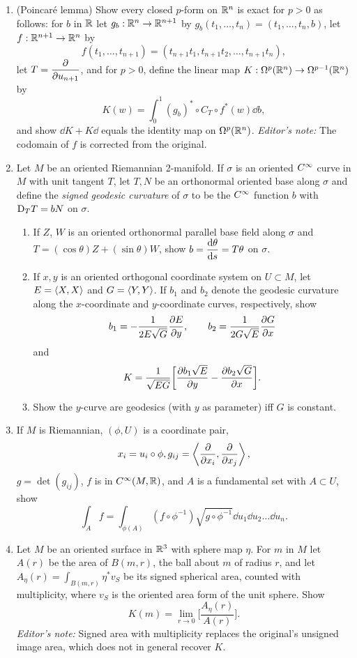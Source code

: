 \documentclass[../main]{subfiles}
\begin{document}
\begin{enumerate}
    
    \item\label{pro:71} (Poincar\'e lemma) Show every closed $p$-form on $\bbR^{n}$ is exact for $p>0$ as follows: for $b$ in $\bbR$ let $g_{b}: \bbR^{n} \rightarrow \bbR^{n+1}$ by $g_{b}\left(t_{1}, \ldots, t_{n}\right)=\left(t_{1}, \ldots, t_{n}, b\right)$, let $f: \bbR^{n+1} \rightarrow \bbR^n$ by \[f\left(t_{1}, \ldots, t_{n+1}\right)=\left(t_{n+1} t_{1}, t_{n+1} t_{2}, \ldots, t_{n+1} t_{n}\right),\] let $T=\pdv{}{u_{n+1}}$, and for $p>0$, define the linear map $K: \formbundle{\bbR^{n}}{p} \rightarrow \formbundle{\bbR^{n}}{p-1}$ by \[K(w)=\int_{0}^{1}(g_{b})^\ast \circ C_{T} \circ f^\ast(w) \dd b,\] and show $\dd K+K \dd$ equals the identity map on $\formbundle{\bbR^{n}}{p}$. \emph{Editor's note:} The codomain of $f$ is corrected from the original.
    \item\label{pro:72} Let $M$ be an oriented Riemannian 2-manifold. If $\sigma$ is an oriented $\CInfty$ curve in $M$ with unit tangent $T$, let $T, N$ be an orthonormal oriented base along $\sigma$ and define the \emph{signed geodesic curvature} of $\sigma$ to be the $\CInfty$ function $b$ with $\connection_{T} T=b N$ on $\sigma$. 
    \begin{enumerate}[label = (\roman*)]
        \item If $Z$, $W$ is an oriented orthonormal parallel base field along $\sigma$ and $T=(\cos \theta) Z+(\sin \theta) W$, show $b = \dv{\theta}{s} = T \theta$ on $\sigma$.
        \item If $x, y$ is an oriented orthogonal coordinate system on $U\subset M$, let $E=\ip X X$ and $G = \ip Y Y$. If $b_1$ and $b_{2}$ denote the geodesic curvature along the $x$-coordinate and $y$-coordinate curves, respectively, show \[b_{1}=-\dfrac{1}{2E\sqrt{G}}\pdv{E}{y}, \qquad b_{2}=\dfrac{1}{2G\sqrt{E}}\pdv{G}{x}\] and \[K=\dfrac{1}{\sqrt{EG}} \bigg[ \pdv{b_1\sqrt{E}}{y}-\pdv{b_2\sqrt{G}}{x}\bigg].\]
        \item  Show the $y$-curve are geodesics (with $y$ as parameter) iff $G$ is constant.
    \end{enumerate}
     
    
    \item\label{pro:73} If $M$ is Riemannian, $(\phi, U)$ is a coordinate pair, \[x_i = u_i \circ \phi,g_{ij} = \ip {\pdv{}{x_i}}{\pdv{}{x_j}},\] $g = \det(g_{ij})$, $f$ is in $\CInfty(M, \bbR)$, and $A$ is a fundamental set with $A \subset U$, show \[\int_A f = \int_{\phi(A)} (f \circ \phi^{-1}) \sqrt {g \circ \phi^{-1}} \dd u_1 \dd u_2 \ldots \dd u_n.\]
    
    \item\label{pro:74} Let $M$ be an oriented surface in $\bbR^3$ with sphere map $\eta$. For $m$ in $M$ let $A(r)$ be the area of $B(m, r)$, the ball about $m$ of radius $r$, and let $A_\eta(r)=\int_{B(m,r)}\eta^\ast v_S$ be its signed spherical area, counted with multiplicity, where $v_S$ is the oriented area form of the unit sphere. Show \[ K(m) = \lim_{r \to 0} \Big[\dfrac{A_\eta(r)}{A(r)}\Big]. \] \emph{Editor's note:} Signed area with multiplicity replaces the original's unsigned image area, which does not in general recover $K$.
\end{enumerate}
\end{document}

